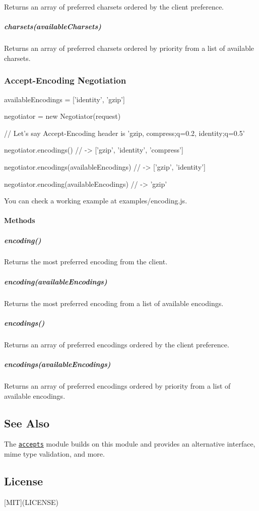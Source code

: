 Returns an array of preferred charsets ordered by the client preference.

\subparagraph*{charsets(available\+Charsets)}

Returns an array of preferred charsets ordered by priority from a list of available charsets.

\subsubsection*{Accept-\/\+Encoding Negotiation}


\begin{DoxyCode}
availableEncodings = [\textcolor{stringliteral}{'identity'}, \textcolor{stringliteral}{'gzip'}]

negotiator = \textcolor{keyword}{new} Negotiator(request)

\textcolor{comment}{// Let's say Accept-Encoding header is 'gzip, compress;q=0.2, identity;q=0.5'}

negotiator.encodings()
\textcolor{comment}{// -> ['gzip', 'identity', 'compress']}

negotiator.encodings(availableEncodings)
\textcolor{comment}{// -> ['gzip', 'identity']}

negotiator.encoding(availableEncodings)
\textcolor{comment}{// -> 'gzip'}
\end{DoxyCode}


You can check a working example at {\ttfamily examples/encoding.\+js}.

\paragraph*{Methods}

\subparagraph*{encoding()}

Returns the most preferred encoding from the client.

\subparagraph*{encoding(available\+Encodings)}

Returns the most preferred encoding from a list of available encodings.

\subparagraph*{encodings()}

Returns an array of preferred encodings ordered by the client preference.

\subparagraph*{encodings(available\+Encodings)}

Returns an array of preferred encodings ordered by priority from a list of available encodings.

\subsection*{See Also}

The \href{https://npmjs.org/package/accepts#readme}{\tt accepts} module builds on this module and provides an alternative interface, mime type validation, and more.

\subsection*{License}

\mbox{[}M\+I\+T\mbox{]}(L\+I\+C\+E\+N\+S\+E) 